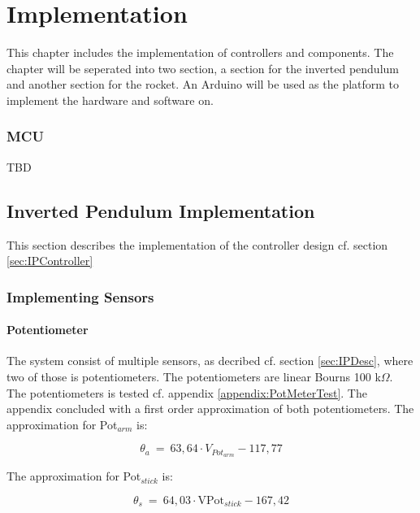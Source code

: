 \chapter{Implementation}
This chapter includes the implementation of controllers and components. The chapter will be seperated into two section, a section for the inverted pendulum and another section for the rocket. An Arduino will be used as the platform to implement the hardware and software on.    


\subsection{MCU}\label{sec:MCU}
TBD


\section{Inverted Pendulum Implementation}
This section describes the implementation of the controller design cf. section \ref{sec:IPController}

\subsection{Implementing Sensors}

\subsubsection*{Potentiometer}\label{section:PotmeterImplementation}
The system consist of multiple sensors, as decribed cf. section \ref{sec:IPDesc}, where two of those is potentiometers. The potentiometers are linear Bourns 100 k$\Omega$. The potentiometers is tested cf. appendix \ref{appendix:PotMeterTest}. The appendix concluded with a first order approximation of both potentiometers. The approximation for Pot$_{arm}$ is:

\begin{equation}
\theta_a\ =\ 63,64 \cdot V_{{Pot}_{arm}} - 117,77
\end{equation}
\startexplain
\stopexplain

The approximation for Pot$_{stick}$ is:

\begin{equation}
\theta_s\ =\ 64,03 \cdot \text{VPot}_{stick} - 167,42
\end{equation}

